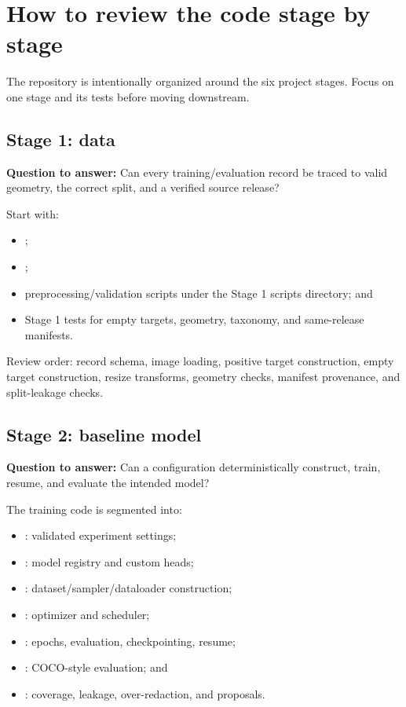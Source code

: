\chapter{How to review the code stage by stage}

The repository is intentionally organized around the six project stages. Focus on one stage and its tests before moving downstream.

\section{Stage 1: data}

\textbf{Question to answer:} Can every training/evaluation record be traced to valid geometry, the correct split, and a verified source release?

Start with:

\begin{itemize}[leftmargin=6mm]
  \item {};
  \item {};
  \item preprocessing/validation scripts under the Stage 1 scripts directory; and
  \item Stage 1 tests for empty targets, geometry, taxonomy, and same-release manifests.
\end{itemize}

Review order: record schema, image loading, positive target construction, empty target construction, resize transforms, geometry checks, manifest provenance, and split-leakage checks.

\section{Stage 2: baseline model}

\textbf{Question to answer:} Can a configuration deterministically construct, train, resume, and evaluate the intended model?

The training code is segmented into:

\begin{itemize}[leftmargin=6mm]
  \item {}: validated experiment settings;
  \item {}: model registry and custom heads;
  \item {}: dataset/sampler/dataloader construction;
  \item {}: optimizer and scheduler;
  \item {}: epochs, evaluation, checkpointing, resume;
  \item {}: COCO-style evaluation; and
  \item {}: coverage, leakage, over-redaction, and proposals.
\end{itemize}

